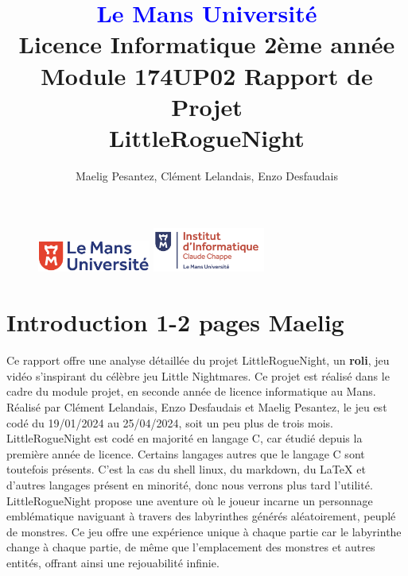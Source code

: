 \documentclass[10pt]{article}
\begin{document}
\begin{figure}
\includegraphics[width=3.7cm]{logolemansU.png}
\hspace{160pt}
\includegraphics[width=3.7cm]{logo_IC2.png}
\end{figure}

\title{\textbf{\textcolor{blue}{Le Mans Université}}\\Licence Informatique 2ème année\\Module 174UP02 Rapport de Projet\\\textbf{LittleRogueNight}}
\author{Maelig Pesantez, Clément Lelandais, Enzo Desfaudais}
\maketitle

\newpage
\tableofcontents

\newpage

\section{Introduction 1-2 pages Maelig}
Ce rapport offre une analyse détaillée du projet LittleRogueNight, un \textbf{\gls{roli}}, jeu vidéo s'inspirant du célèbre jeu Little Nightmares. 
Ce projet est réalisé dans le cadre du module projet, en seconde année de licence informatique au Mans.
Réalisé par Clément Lelandais, Enzo Desfaudais et Maelig Pesantez, le jeu est codé du 19/01/2024 au 25/04/2024, soit un peu plus de trois mois.
LittleRogueNight est codé en majorité en langage C, car étudié depuis la première année de licence. Certains langages autres que le langage C sont toutefois présents.
C'est la cas du shell linux, du markdown, du LaTeX et d'autres langages présent en minorité, donc nous verrons plus tard l'utilité.
LittleRogueNight propose une aventure où le joueur incarne un personnage emblématique naviguant à travers des labyrinthes générés aléatoirement, 
peuplé de monstres. 
Ce jeu offre une expérience unique à chaque partie car le labyrinthe change à chaque partie, de même que l'emplacement des monstres et autres entités, offrant ainsi une rejouabilité infinie.\\
\end{document}
